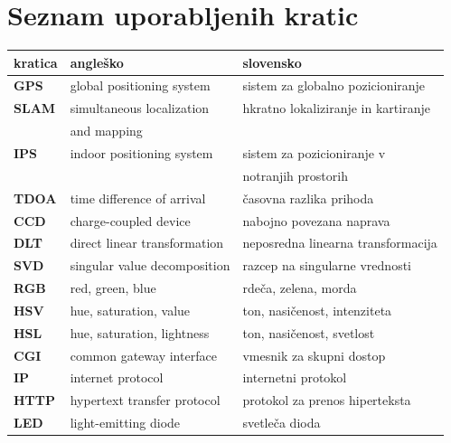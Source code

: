 \documentclass[a4paper, 12pt]{book}
\newcommand{\clearemptydoublepage}{\newpage{\pagestyle{empty}\cleardoublepage}}
\begin{document}
\clearemptydoublepage


\chapter*{Seznam uporabljenih kratic}

\begin{tabular}{l|l|l}
  {\bf kratica} & {\bf angleško} & {\bf slovensko} \\ \hline
  {\bf GPS} & global positioning system & sistem za globalno pozicioniranje \\
  {\bf SLAM} & simultaneous localization & hkratno lokaliziranje in kartiranje \\
            & and mapping & \\
  {\bf IPS} & indoor positioning system & sistem za pozicioniranje v \\
  			& 							& notranjih prostorih \\
  {\bf TDOA} & time difference of arrival & časovna razlika prihoda \\
  {\bf CCD} & charge-coupled device & nabojno povezana naprava \\
  {\bf DLT} & direct linear transformation & neposredna linearna transformacija \\
  {\bf SVD} & singular value decomposition & razcep na singularne vrednosti \\
  {\bf RGB} & red, green, blue & rdeča, zelena, morda \\
  {\bf HSV} & hue, saturation, value & ton, nasičenost, intenziteta \\
  {\bf HSL} & hue, saturation, lightness & ton, nasičenost, svetlost \\
  {\bf CGI} & common gateway interface & vmesnik za skupni dostop \\
  {\bf IP} & internet protocol & internetni protokol \\
  {\bf HTTP} & hypertext transfer protocol & protokol za prenos hiperteksta \\
  {\bf LED} & light-emitting diode & svetleča dioda \\
\end{tabular}



\clearemptydoublepage

\end{document}
